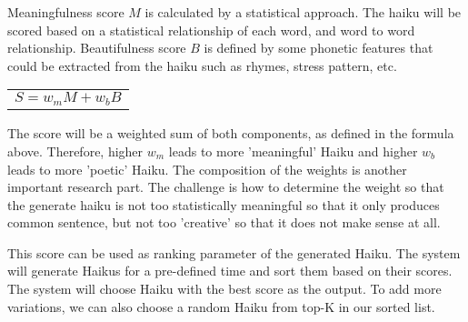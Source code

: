 Meaningfulness score $M$ is calculated by a statistical approach. The haiku will be scored based on a statistical relationship of each word, and word to word relationship. Beautifulness score $B$ is defined by some phonetic features that could be extracted from the haiku such as rhymes, stress pattern, etc.


\begin{table}[h]

\centering

\begin{tabular}{c}


$S = w_mM + w_bB$

\\

\end{tabular} 


\end{table}



The score will be a weighted sum of both components, as defined in the formula above. Therefore, higher $w_m$ leads to more 'meaningful' Haiku and higher $w_b$ leads to more 'poetic' Haiku. The composition of the weights is another important research part. The challenge is how to determine the weight so that the generate haiku is not too statistically meaningful so that it only produces common sentence, but not too 'creative' so that it does not make sense at all. 

This score can be used as ranking parameter of the generated Haiku. The system will generate Haikus for a pre-defined time and sort them based on their scores. The system will choose Haiku with the best score as the output. To add more variations, we can also choose a random Haiku from top-K in our sorted list.